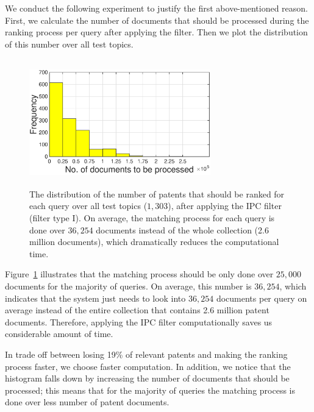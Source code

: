 We conduct the following experiment to justify the first above-mentioned reason. First, we calculate the number of documents that should be processed during the ranking process per query after applying the filter. Then we plot the distribution of this number over all test topics.
\begin{figure}[t!]
   \centering
   \includegraphics[width=0.70\textwidth,height=55mm]{figs/filter1}
   \caption{The distribution of the number of patents that should be ranked for each query over all test topics ($1,303$), after applying the IPC filter (filter type I).
On average, the matching process for each query is done over $ 36,254 $ documents instead of the whole collection (2.6 million documents), which dramatically reduces the computational time.}   
   \label{fig:ipcfilter-histo} 
\end{figure}
Figure~\ref{fig:ipcfilter-histo} illustrates that the matching process should be only done over $25,000$ documents for the majority of queries. On average, this number is $ 36,254 $, which indicates that the system just needs to look into $ 36,254 $ documents per query on average instead of the entire collection that contains 2.6 million patent documents. Therefore, applying the IPC filter computationally saves us considerable amount of time.   

In trade off between losing 19\% of relevant patents and making the ranking process faster, we choose faster computation. In addition, we notice that the histogram falls down by increasing the number of documents that should be processed; this means that for the majority of queries the matching process is done over less number of patent documents.

